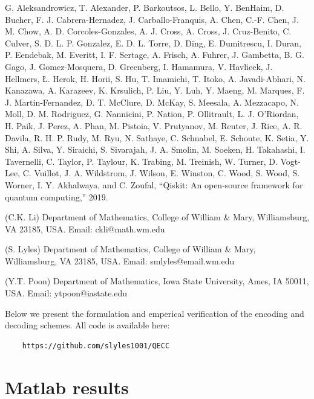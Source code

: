 \documentclass[11pt]{article}
\begin{document}
\begin{thebibliography}{WWW}
  G.  Aleksandrowicz,  T.  Alexander,  P.  Barkoutsos,  L.  Bello,  Y.  BenHaim,  D.  Bucher,  F.  J.  Cabrera-Hernadez,  J.  Carballo-Franquis, A.  Chen,  C.-F.  Chen,  J.  M.  Chow,  A.  D.  Corcoles-Gonzales,  A.  J. Cross,  A.  Cross,  J.  Cruz-Benito,  C.  Culver,  S.  D.  L.  P.  Gonzalez, E.   D.   L.   Torre,   D.   Ding,   E.   Dumitrescu,   I.   Duran,   P.   Eendebak,  M.  Everitt,  I.  F.  Sertage,  A.  Frisch,  A.  Fuhrer,  J.  Gambetta, B.  G.  Gago,  J.  Gomez-Mosquera,  D.  Greenberg,  I.  Hamamura, V.  Havlicek,  J.  Hellmers,  Ł.  Herok,  H.  Horii,  S.  Hu,  T.  Imamichi, T. Itoko, A. Javadi-Abhari, N. Kanazawa, A. Karazeev, K. Krsulich,
P. Liu, Y. Luh, Y. Maeng, M. Marques, F. J. Martin-Fernandez, D. T.
McClure,  D.  McKay,  S.  Meesala,  A.  Mezzacapo,  N.  Moll,  D.  M. Rodriguez,  G.  Nannicini,  P.  Nation,  P.  Ollitrault,  L.  J.  O’Riordan, H.  Paik,  J.  Perez,  A.  Phan,  M.  Pistoia,  V.  Prutyanov,  M.  Reuter, J. Rice, A. R. Davila, R. H. P. Rudy, M. Ryu, N. Sathaye, C. Schnabel,
E. Schoute, K. Setia, Y. Shi, A. Silva, Y. Siraichi, S. Sivarajah, J. A.
Smolin, M. Soeken, H. Takahashi, I. Tavernelli, C. Taylor, P. Taylour,
K.  Trabing,  M.  Treinish,  W.  Turner,  D.  Vogt-Lee,  C.  Vuillot,  J.  A.
Wildstrom, J. Wilson, E. Winston, C. Wood, S. Wood, S. Worner, I. Y. Akhalwaya, and C. Zoufal, “Qiskit: An open-source framework for quantum computing,” 2019.

 
\end{thebibliography}


\noindent
(C.K. Li) Department of Mathematics, College of William \& Mary,
Williamsburg, VA 23185, USA. Email: ckli@math.wm.edu

\noindent
(S. Lyles) Department of Mathematics, College of William \& Mary,
Williamsburg, VA 23185, USA. Email:
smlyles@email.wm.edu

\noindent
(Y.T. Poon) Department of Mathematics, Iowa State University,
Ames, IA 50011, USA. Email: ytpoon@iastate.edu



\clearpage

\appendix
Below we present the formulation and emperical verification of the encoding and decoding schemes.
All code is available here:
\begin{verbatim}
    https://github.com/slyles1001/QECC
\end{verbatim}

\section{Matlab results}
\end{document}

